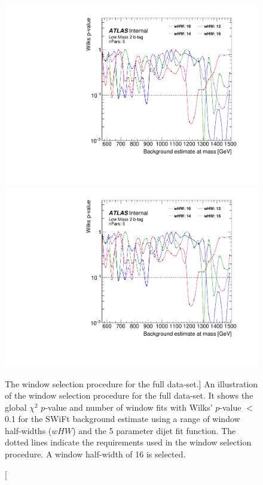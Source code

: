 \begin{figure}[!htb]
\captionsetup[subfigure]{aboveskip=0pt,justification=centering}
\centering
{} {
  \includegraphics[width=0.45\linewidth, angle=0,page=6]{figs/Dibjet/LowMass/FitStudy_min566/windowSel_unblind.pdf}
}\hspace{-5mm}
 {
  \includegraphics[width=0.45\linewidth, angle=0,page=8]{figs/Dibjet/LowMass/FitStudy_min566/windowSel_unblind.pdf}
}
\vspace{2pt}
\caption
    [The window selection procedure for the full \lm{} data-set.]
    {\label{fig:windowSel_unblind}
      An illustration of the window selection procedure for the full \lm{} data-set.
      It shows the global $\chi^{2}$ \mbox{$p$-value} and number of window fits with Wilks' \mbox{$p$-value} $<$ 0.1
      for the SWiFt background estimate using a range of window half-widths ($wHW$) and the 5 parameter dijet fit function.
      The dotted lines indicate the requirements used in the window selection procedure. A window half-width of 16 is selected.
    }
\end{figure}

